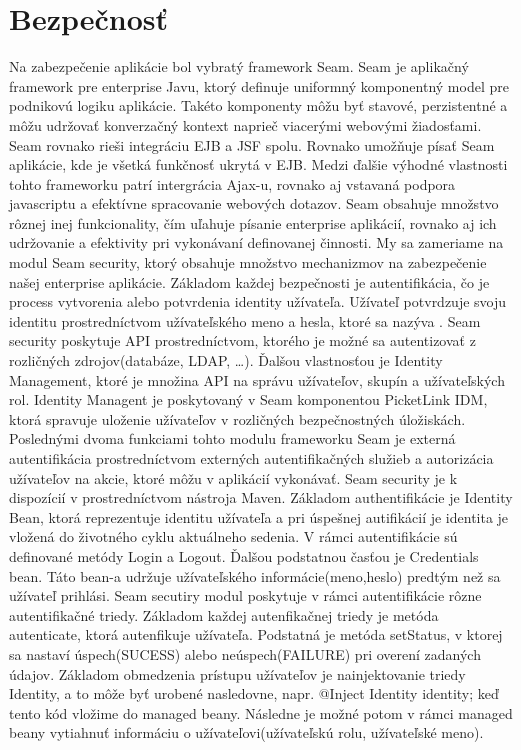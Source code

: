 \section{Bezpečnosť}
Na zabezpečenie aplikácie bol vybratý framework Seam. Seam je aplikačný framework pre enterprise Javu, ktorý definuje uniformný komponentný model pre podnikovú logiku aplikácie. Takéto komponenty môžu byť stavové, perzistentné a môžu udržovať konverzačný kontext naprieč viacerými webovými žiadosťami. Seam rovnako rieši integráciu EJB a JSF spolu. Rovnako umožňuje písať Seam aplikácie, kde je všetká funkčnosť ukrytá v EJB. Medzi ďalšie výhodné vlastnosti tohto frameworku patrí intergrácia Ajax-u, rovnako aj vstavaná podpora javascriptu a efektívne spracovanie webových dotazov. Seam obsahuje množstvo rôznej inej funkcionality, čím uľahuje písanie enterprise aplikácií, rovnako aj ich udržovanie a efektivity pri vykonávaní definovanej činnosti. My sa zameriame na modul Seam security, ktorý obsahuje množstvo mechanizmov na zabezpečenie našej enterprise aplikácie. Základom každej bezpečnosti je autentifikácia, čo je process vytvorenia alebo potvrdenia identity užívateľa. Užívateľ potvrdzuje svoju identitu prostredníctvom užívateľského meno a hesla, ktoré sa nazýva . Seam security poskytuje API prostredníctvom, ktorého je možné sa autentizovať z rozličných zdrojov(databáze, LDAP, \ldots). Ďalšou vlastnosťou je Identity Management, ktoré je množina API na správu užívateľov, skupín a užívateľských rol. Identity Managent je poskytovaný v Seam komponentou PicketLink IDM, ktorá spravuje uloženie užívateľov v rozličných bezpečnostných úložiskách. Poslednými dvoma funkciami tohto modulu frameworku Seam je externá autentifikácia prostredníctvom externých autentifikačných služieb a autorizácia užívateľov na akcie, ktoré môžu v aplikácií vykonávať. Seam security je k dispozícií v prostredníctvom nástroja Maven. Základom authentifikácie je Identity Bean, ktorá reprezentuje identitu užívateľa a pri úspešnej autifikácií je identita je vložená do životného cyklu aktuálneho sedenia. V rámci autentifikácie sú definované metódy Login a Logout. Ďalšou podstatnou časťou je Credentials bean. Táto bean-a udržuje užívateľského informácie(meno,heslo) predtým než sa užívateľ prihlási. Seam secutiry modul poskytuje v rámci autentifikácie rôzne autentifikačné triedy. Základom každej autenfikačnej triedy je metóda autenticate, ktorá autenfikuje užívateľa. Podstatná je metóda setStatus, v ktorej sa nastaví úspech(SUCESS) alebo neúspech(FAILURE) pri overení zadaných údajov. Základom obmedzenia prístupu užívateľov je nainjektovanie triedy Identity, a to môže byť urobené nasledovne, napr. @Inject Identity identity; keď tento kód vložime do managed beany. Následne je možné potom v rámci managed beany vytiahnuť informáciu o užívateľovi(užívateľskú rolu, užívateľské meno).
